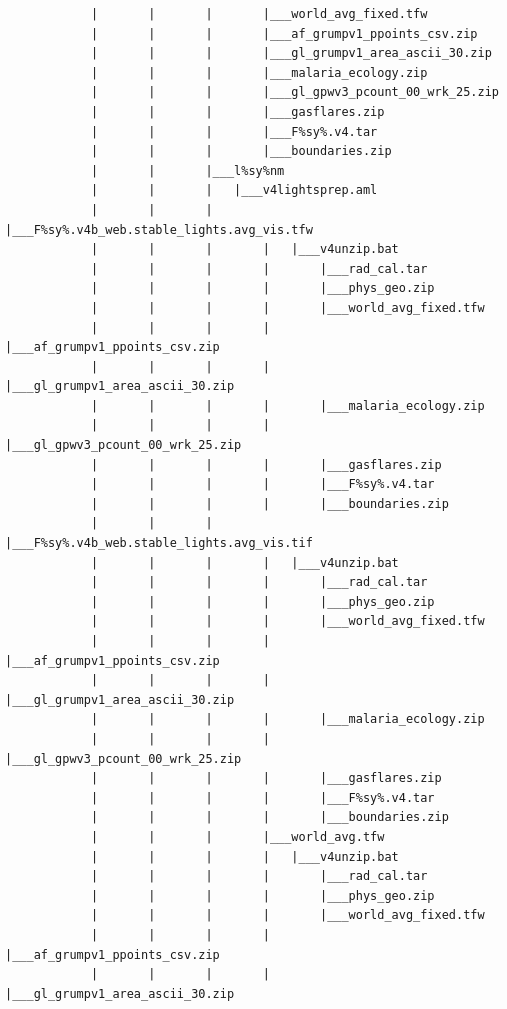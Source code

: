 \documentclass[
]{book}
\begin{document}
\begin{verbatim}
            |       |       |       |___world_avg_fixed.tfw
            |       |       |       |___af_grumpv1_ppoints_csv.zip
            |       |       |       |___gl_grumpv1_area_ascii_30.zip
            |       |       |       |___malaria_ecology.zip
            |       |       |       |___gl_gpwv3_pcount_00_wrk_25.zip
            |       |       |       |___gasflares.zip
            |       |       |       |___F%sy%.v4.tar
            |       |       |       |___boundaries.zip
            |       |       |___l%sy%nm
            |       |       |   |___v4lightsprep.aml
            |       |       |       |___F%sy%.v4b_web.stable_lights.avg_vis.tfw
            |       |       |       |   |___v4unzip.bat
            |       |       |       |       |___rad_cal.tar
            |       |       |       |       |___phys_geo.zip
            |       |       |       |       |___world_avg_fixed.tfw
            |       |       |       |       |___af_grumpv1_ppoints_csv.zip
            |       |       |       |       |___gl_grumpv1_area_ascii_30.zip
            |       |       |       |       |___malaria_ecology.zip
            |       |       |       |       |___gl_gpwv3_pcount_00_wrk_25.zip
            |       |       |       |       |___gasflares.zip
            |       |       |       |       |___F%sy%.v4.tar
            |       |       |       |       |___boundaries.zip
            |       |       |       |___F%sy%.v4b_web.stable_lights.avg_vis.tif
            |       |       |       |   |___v4unzip.bat
            |       |       |       |       |___rad_cal.tar
            |       |       |       |       |___phys_geo.zip
            |       |       |       |       |___world_avg_fixed.tfw
            |       |       |       |       |___af_grumpv1_ppoints_csv.zip
            |       |       |       |       |___gl_grumpv1_area_ascii_30.zip
            |       |       |       |       |___malaria_ecology.zip
            |       |       |       |       |___gl_gpwv3_pcount_00_wrk_25.zip
            |       |       |       |       |___gasflares.zip
            |       |       |       |       |___F%sy%.v4.tar
            |       |       |       |       |___boundaries.zip
            |       |       |       |___world_avg.tfw
            |       |       |       |   |___v4unzip.bat
            |       |       |       |       |___rad_cal.tar
            |       |       |       |       |___phys_geo.zip
            |       |       |       |       |___world_avg_fixed.tfw
            |       |       |       |       |___af_grumpv1_ppoints_csv.zip
            |       |       |       |       |___gl_grumpv1_area_ascii_30.zip

\end{verbatim}
\end{document}
